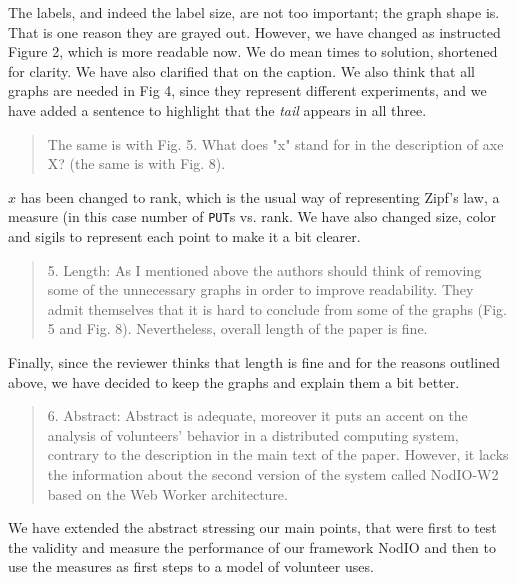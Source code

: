 \documentclass[preprint]{elsarticle}
\begin{document}
The labels, and indeed the label size, are not too important; the
graph shape is. That is one reason they are grayed out. However, we
have changed as instructed Figure 2, which is more readable now. We do
mean times to solution, shortened for clarity. We have also clarified
that on the caption. We also think that all graphs are needed in Fig
4, since they represent different experiments, and we have added a
sentence to highlight that the {\em tail} appears in all three. 

\begin{quote}
The same is with Fig. 5. What does "x" stand for in the description of
axe X? (the same is with Fig. 8).
\end{quote}

$x$ has been changed to {\sf rank}, which is the usual way of
representing Zipf's law, a measure (in this case number of {\tt PUT}s
vs. rank. We have also changed size, color and sigils to represent
each point to make it a bit clearer. 

\begin{quote}

5. Length: As I mentioned above the authors should think of removing some of the unnecessary graphs
in order to improve readability. They admit themselves that it is hard to conclude from some of the
graphs (Fig. 5 and Fig. 8). Nevertheless, overall length of the paper is fine.

\end{quote}

Finally, since the reviewer thinks that length is fine and for the
reasons outlined above, we have decided to keep the graphs and explain
them a bit better.

\begin{quote}
6. Abstract: Abstract is adequate, moreover it puts an accent on the analysis of volunteers' behavior in a
distributed computing system, contrary to the description in the main text of the paper. However, it
lacks the information about the second version of the system called NodIO-W2 based on the Web
Worker architecture.
\end{quote}

We have extended the abstract stressing our main points, that were
first to test the validity and measure the performance of our
framework NodIO and then to use the measures as first steps to a model
of volunteer uses. 
\end{document}
